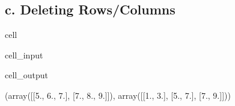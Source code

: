 \documentclass[letterpaper,10pt,english]{jupyterBook}
\begin{document}
\subsection{c. Deleting Rows/Columns}
\label{\detokenize{lessons/Intro_to_Matrices_in_NumPy:c-deleting-rows-columns}}
\begin{sphinxuseclass}{cell}\begin{sphinxVerbatimInput}

\begin{sphinxuseclass}{cell_input}
\begin{sphinxVerbatim}[commandchars=\\\{\}]
    

    

 
\end{sphinxVerbatim}

\end{sphinxuseclass}\end{sphinxVerbatimInput}
\begin{sphinxVerbatimOutput}

\begin{sphinxuseclass}{cell_output}
\begin{sphinxVerbatim}[commandchars=\\\{\}]
(array([[5., 6., 7.],
        [7., 8., 9.]]),
 array([[1., 3.],
        [5., 7.],
        [7., 9.]]))
\end{sphinxVerbatim}

\end{sphinxuseclass}\end{sphinxVerbatimOutput}

\end{sphinxuseclass}
\end{document}
